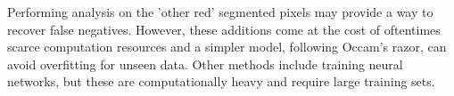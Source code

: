 \documentclass[letterpaper, 10 pt, conference]{ieeeconf}  %
\begin{document}
Performing analysis on the 'other red' segmented pixels may provide a way to recover false negatives. However, these additions come at the cost of oftentimes scarce computation resources and a simpler model, following Occam's razor, can avoid overfitting for unseen data. Other methods include training neural networks, but these are computationally heavy and require large training sets.



\addtolength{\textheight}{-12cm}   %









\end{document}
